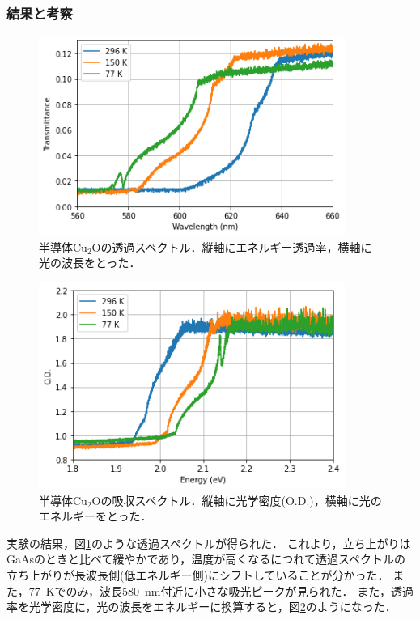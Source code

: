 \documentclass[titlepage]{jsarticle}
\begin{document}
\subsubsection{結果と考察}
\begin{figure}[htbp]
  \centering
  \includegraphics[width=10cm]{Cu2O_transmittance.png}
  \caption{半導体Cu$_2$Oの透過スペクトル．縦軸にエネルギー透過率，横軸に光の波長をとった．}
  \label{fig:Cu2O_transmittance}
\end{figure}

\begin{figure}[htbp]
  \centering
  \includegraphics[width=10cm]{Cu2O_OD_c.png}
  \caption{半導体Cu$_2$Oの吸収スペクトル．縦軸に光学密度(O.D.)，横軸に光のエネルギーをとった．}
  \label{fig:Cu2O_OD_c}
\end{figure}

実験の結果，図\ref{fig:Cu2O_transmittance}のような透過スペクトルが得られた．
これより，立ち上がりはGaAsのときと比べて緩やかであり，温度が高くなるにつれて透過スペクトルの立ち上がりが長波長側(低エネルギー側)にシフトしていることが分かった．
また，\SI{77}{\kelvin}でのみ，波長\SI{580}{\nm}付近に小さな吸光ピークが見られた．
また，透過率を光学密度に，光の波長をエネルギーに換算すると，図\ref{fig:Cu2O_OD_c}のようになった．
\end{document}
